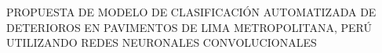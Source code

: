 \begin{center}
	\vspace*{10cm}
	{PROPUESTA DE MODELO DE CLASIFICACIÓN AUTOMATIZADA DE DETERIOROS EN PAVIMENTOS DE LIMA METROPOLITANA, PERÚ UTILIZANDO REDES NEURONALES CONVOLUCIONALES}
\end{center}
